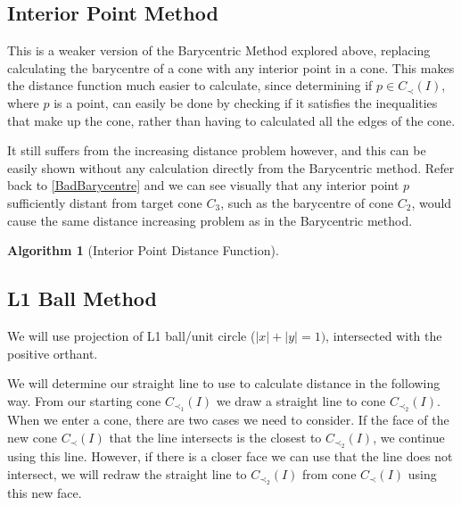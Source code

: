 \documentclass[12pt,a4paper]{report}
\newtheorem{algorithm}[theorem]{Algorithm}
\begin{document}
\subsection{Interior Point Method}
This is a weaker version of the Barycentric Method explored above, replacing calculating the barycentre of a cone with any interior point in a cone. This makes the distance function much easier to calculate, since determining if $p \in C_{\prec} (I)$, where $p$ is a point, can easily be done by checking if it satisfies the inequalities that make up the cone, rather than having to calculated all the edges of the cone. 

It still suffers from the increasing distance problem however, and this can be easily shown without any calculation directly from the Barycentric method. Refer back to \ref{BadBarycentre} and we can see visually that any interior point $p$ sufficiently distant from target cone $C_{3}$, such as the barycentre of cone $C_{2}$, would cause the same distance increasing problem as in the Barycentric method. 


\begin{algorithm}[Interior Point Distance Function]\
 \begin{algorithmic}[1]
 \STATE{dist(l) = $\sqrt{\sum_{i=1}^{n} (a_{i} - b_{i})^{2}}$.}
 \end{algorithmic}
 \end{algorithm}

\subsection{L1 Ball Method}
We will use projection of L1 ball/unit circle ($|x| + |y| = 1)$, intersected with the positive orthant.

We will determine our straight line to use to calculate distance in the following way. From our starting cone $C_{\prec_{1}} (I)$ we draw a straight line to cone $C_{\prec_{2}} (I)$. When we enter a cone, there are two cases we need to consider. If the face of the new cone $C_{\prec} (I)$ that the line intersects is the closest to $C_{\prec_{2}} (I)$, we continue using this line. However, if there is a closer face we can use that the line does not intersect, we will redraw the straight line to $C_{\prec_{2}} (I)$ from cone $C_{\prec} (I)$ using this new face.
\end{document}
